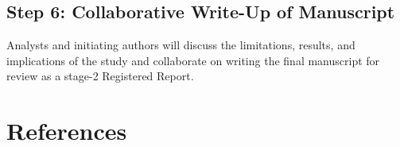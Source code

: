 \documentclass[
  english,
  man]{apa6}
\begin{document}
\hypertarget{step-6-collaborative-write-up-of-manuscript}{%
\subsection{Step 6: Collaborative Write-Up of Manuscript}\label{step-6-collaborative-write-up-of-manuscript}}

Analysts and initiating authors will discuss the limitations, results, and implications of the study and collaborate on writing the final manuscript for review as a stage-2 Registered Report.

\newpage

\hypertarget{references}{%
\section{References}\label{references}}

\begingroup
\setlength{\parindent}{-0.5in}
\setlength{\leftskip}{0.5in}
\end{document}
